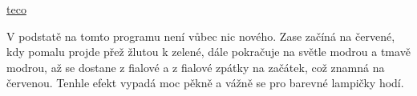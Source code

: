 \href{https://www.tecomat.cz/products/}{teco}

%



V podstatě na tomto programu není vůbec nic nového. Zase začíná na červené, kdy pomalu projde přež žlutou k zelené, dále pokračuje na světle modrou a tmavě modrou, až se dostane z fialové a z fialové zpátky na začátek, což znamná na červenou. Tenhle efekt vypadá moc pěkně a vážně se pro barevné lampičky hodí. 



\newpage